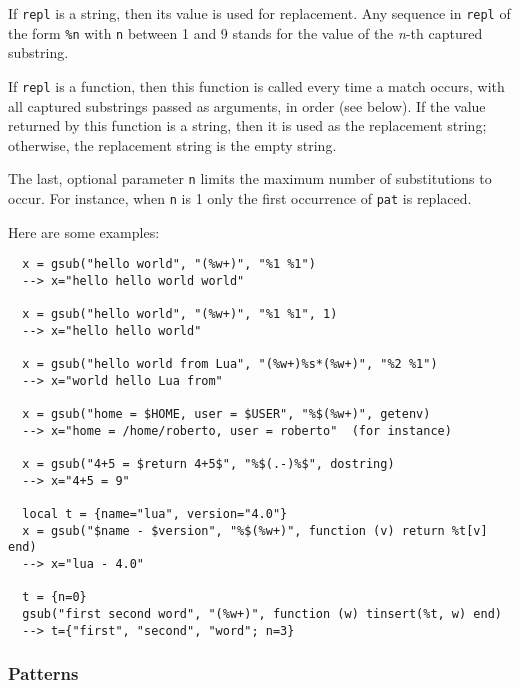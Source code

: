 \documentclass[11pt]{article}
\newcommand{\M}[1]{\rm\emph{#1}}
\begin{document}
If \verb|repl| is a string, then its value is used for replacement.
Any sequence in \verb|repl| of the form \verb|%n|
with \verb|n| between 1 and 9
stands for the value of the \M{n}-th captured substring.

If \verb|repl| is a function, then this function is called every time a
match occurs, with all captured substrings passed as arguments,
in order (see below).
If the value returned by this function is a string,
then it is used as the replacement string;
otherwise, the replacement string is the empty string.

The last, optional parameter \verb|n| limits
the maximum number of substitutions to occur.
For instance, when \verb|n| is 1 only the first occurrence of
\verb|pat| is replaced.

Here are some examples:
\begin{verbatim}
  x = gsub("hello world", "(%w+)", "%1 %1")
  --> x="hello hello world world"

  x = gsub("hello world", "(%w+)", "%1 %1", 1)
  --> x="hello hello world"

  x = gsub("hello world from Lua", "(%w+)%s*(%w+)", "%2 %1")
  --> x="world hello Lua from"

  x = gsub("home = $HOME, user = $USER", "%$(%w+)", getenv)
  --> x="home = /home/roberto, user = roberto"  (for instance)

  x = gsub("4+5 = $return 4+5$", "%$(.-)%$", dostring)
  --> x="4+5 = 9"

  local t = {name="lua", version="4.0"}
  x = gsub("$name - $version", "%$(%w+)", function (v) return %t[v] end)
  --> x="lua - 4.0"

  t = {n=0}
  gsub("first second word", "(%w+)", function (w) tinsert(%t, w) end)
  --> t={"first", "second", "word"; n=3}
\end{verbatim}


\subsubsection*{Patterns} \label{pm}
\end{document}
